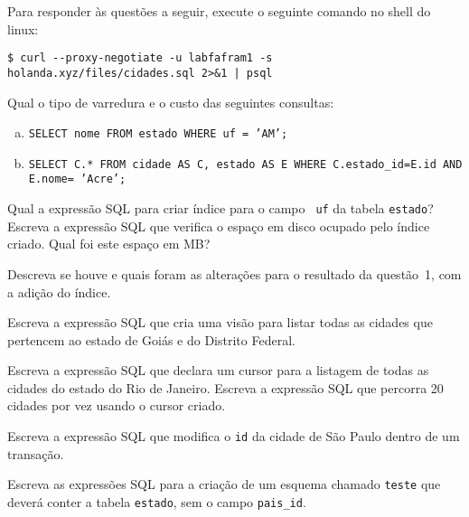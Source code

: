 Para responder às questões a seguir, execute o seguinte comando no
shell do linux:

\begin{verbatim}
$ curl --proxy-negotiate -u labfafram1 -s holanda.xyz/files/cidades.sql 2>&1 | psql
\end{verbatim}

 Qual o tipo de varredura e o custo das seguintes consultas:

\begin{enumerate}[a)]
\item {\tt SELECT nome FROM estado WHERE uf = 'AM';}
\item {\tt SELECT C.* FROM cidade AS C, estado AS E WHERE C.estado\_id=E.id AND E.nome= 'Acre';}
\end{enumerate}

 Qual a expressão SQL para criar índice para o campo {\tt
  uf} da tabela {\tt estado}? Escreva a expressão SQL que verifica o
espaço em disco ocupado pelo índice criado. Qual foi este espaço em
MB?

 Descreva se houve e quais foram as alterações para o
resultado da questão~1, com a adição do índice.

 Escreva a expressão SQL que cria uma visão para listar todas as 
cidades que pertencem ao estado de Goiás e do Distrito Federal.

 Escreva a expressão SQL que declara um cursor para a
listagem de todas as cidades do estado do Rio de Janeiro. Escreva a
expressão SQL que percorra 20 cidades por vez usando o cursor criado.

 Escreva a expressão SQL que modifica o {\tt id} da cidade
de São Paulo dentro de um transação.

 Escreva as expressões SQL para a criação de um esquema
chamado {\tt teste} que deverá conter a tabela {\tt estado}, sem o
campo {\tt pais\_id}.



